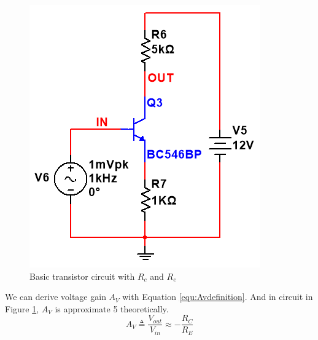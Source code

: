 \begin{figure}[htbp]
\centering
\includegraphics[scale=0.6]{"../Photo/Chap1/basic transistor circuit with Rc and Re"}
\caption{Basic transistor circuit with $R_c$ and $R_e$}
\label{fig:basictransistorcircuitwithRcandRe}
\end{figure}

We can derive voltage gain $A_V$ with Equation \ref{equ:Avdefinition}. And in circuit in Figure \ref{fig:basictransistorcircuitwithRcandRe}, $A_V$ is approximate 5 theoretically.
\begin{equation}
A_V \triangleq \frac{ V_{out}} { V_{in}} \approx -\frac{R_C}{R_E}
\label{equ:Avdefinition}
\end{equation}



